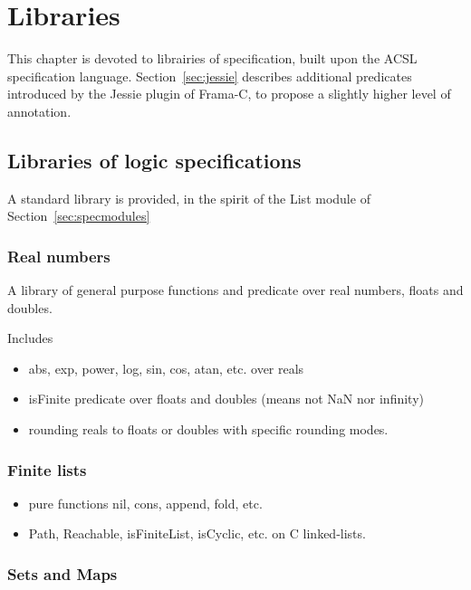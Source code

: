 \chapter{Libraries}
\label{chap:lib}

This chapter is devoted to librairies of specification, built upon the
ACSL specification language.  Section~\ref{sec:jessie} describes
additional predicates introduced by the Jessie plugin of Frama-C, to
propose a slightly higher level of annotation.

\section{Libraries of logic specifications}
\label{sec:speclibraries}

A standard library is provided, in the spirit of the List module of
Section~\ref{sec:specmodules}


\subsection{Real numbers}
\label{sec:libreal}

A library of general purpose functions and predicate over real
numbers, floats and doubles.

Includes

\begin{itemize}
\item abs, exp, power, log, sin, cos, atan, etc. over reals

\item isFinite predicate over floats and doubles (means not NaN nor infinity)

\item rounding reals to floats or doubles with specific rounding modes.

\end{itemize}

\subsection{Finite lists}

\begin{itemize}
\item pure functions nil, cons, append, fold, etc.
\item Path, Reachable, isFiniteList, isCyclic, etc. on C linked-lists.
\end{itemize}


\subsection{Sets and Maps}

